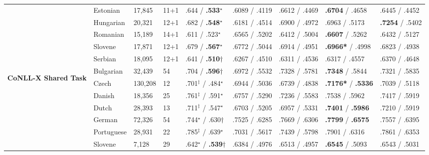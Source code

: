 \begin{table}[ht]
\begin{flushleft}
\begin{tabular}{|@{ }l@{ }|@{ }l@{ }|@{ }l@{ }|@{ }l@{ }|@{ }l@{ }|@{ }l@{ }|@{ }l@{ }|@{ }l@{ }|@{ }l@{ }|}
        & Estonian   & 17,845  & 11+1 & .644 / {\bf.533}$^\star$    & .6089 / .4119 & .6612 / .4469 & {\bf.6704} / .4658     & .6445 / .4452 \\
        & Hungarian  & 20,321  & 12+1 & .682 / {\bf.548}$^\star$    & .6181 / .4514 & .6900 / .4972 & .6963 / .5173     & {\bf.7254} / .5402 \\
        & Romanian   & 15,189  & 14+1 & .611 / .523$^\star$    & .6565 / .5202 & .6412 / .5004 & {\bf .6607} / .5262     & .6432 / .5127 \\
        & Slovene    & 17,871  & 12+1 & .679 / {\bf.567}$^\star$    & .6772 / .5044 & .6914 / .4951 & {\bf .6966*} / .4998     & .6823 / .4938 \\
        & Serbian    & 18,095  & 12+1 & .641 / {\bf.510}$\dagger$   & .6267 / .4510 & .6311 / .4536 & .6317 / .4557     & .6370 / .4648 \\
        \hline %
        \multirow{10}{*}{\begin{sideways}\textbf{CoNLL-X Shared Task}\end{sideways}}
        & Bulgarian  & 32,439  & 54   & .704 / {\bf.596}$\dagger$        & .6972 / .5532 & .7328 / .5781  & {\bf.7348} / .5844     & .7321 / .5835 \\
        & Czech      & 130,208 & 12   & .701$^\ddagger$ / .484$^\star$  & .6944 / .5036 & .6739 / .4838  & {\bf.7176*} / {\bf.5336}     & .7039 / .5118 \\
        & Danish     & 18,356  & 25   & .761$^\ddagger$ / .591$^\star$ & .6757 / .5290 & .7236 / .5583  & .7538 / .5962     & .7417 / .5919 \\
        & Dutch      & 28,393  & 13   & .711$^\ddagger$ / .547$^\star$ & .6703 / .5205 & .6957 / .5331  & {\bf.7401} / {\bf.5986}     & .7210 / .5919 \\
        & German     & 72,326  & 54   & .744$^\star$ / .630$\dagger$& .7525 / .6285 & .7669 / .6306  & {\bf.7799} / {\bf.6575}     & .7557 / .6395 \\
        & Portuguese & 28,931  & 22   & .785$^\ddagger$ / .639$^\star$ & .7031 / .5617 & .7439 / .5798  & .7901 / .6316     & .7861 / .6353 \\
        & Slovene    & 7,128   & 29   & .642$^\star$ / {\bf.539}$\dagger$    & .6384 / .4976 & .6513 / .4957  & {\bf.6545} / .5093     & .6543 / .5031 \\

\end{tabular}
\end{flushleft}
\end{table}
